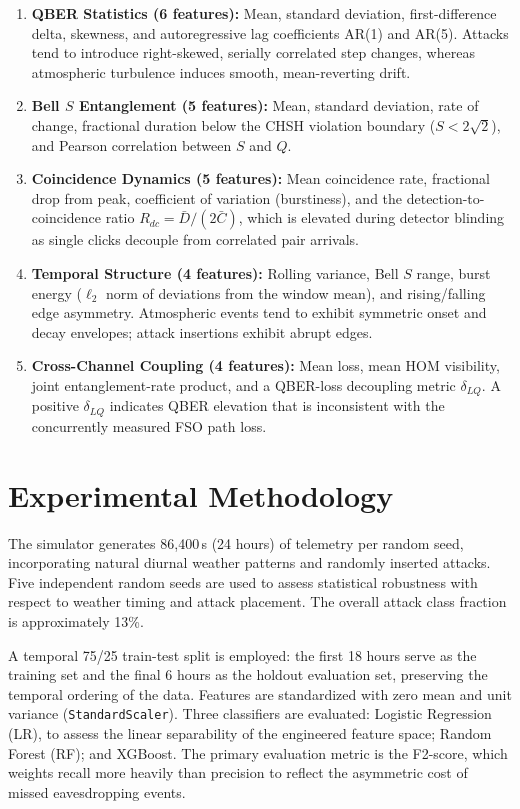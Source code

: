 \documentclass[conference]{IEEEtran}
\begin{document}
\begin{enumerate}
    \item \textbf{QBER Statistics (6 features):} Mean, standard deviation, first-difference delta, skewness, and autoregressive lag coefficients AR(1) and AR(5). Attacks tend to introduce right-skewed, serially correlated step changes, whereas atmospheric turbulence induces smooth, mean-reverting drift.
    \item \textbf{Bell $S$ Entanglement (5 features):} Mean, standard deviation, rate of change, fractional duration below the CHSH violation boundary ($S < 2\sqrt{2}$), and Pearson correlation between $S$ and $Q$.
    \item \textbf{Coincidence Dynamics (5 features):} Mean coincidence rate, fractional drop from peak, coefficient of variation (burstiness), and the detection-to-coincidence ratio $R_{dc} = \bar{D}/(2\bar{C})$, which is elevated during detector blinding as single clicks decouple from correlated pair arrivals.
    \item \textbf{Temporal Structure (4 features):} Rolling variance, Bell $S$ range, burst energy ($\ell_2$ norm of deviations from the window mean), and rising/falling edge asymmetry. Atmospheric events tend to exhibit symmetric onset and decay envelopes; attack insertions exhibit abrupt edges.
    \item \textbf{Cross-Channel Coupling (4 features):} Mean loss, mean HOM visibility, joint entanglement-rate product, and a QBER-loss decoupling metric $\delta_{LQ}$. A positive $\delta_{LQ}$ indicates QBER elevation that is inconsistent with the concurrently measured FSO path loss.
\end{enumerate}

\section{Experimental Methodology}

The simulator generates 86,400\,s (24 hours) of telemetry per random seed, incorporating natural diurnal weather patterns and randomly inserted attacks. Five independent random seeds are used to assess statistical robustness with respect to weather timing and attack placement. The overall attack class fraction is approximately 13\%.

A temporal 75/25 train-test split is employed: the first 18 hours serve as the training set and the final 6 hours as the holdout evaluation set, preserving the temporal ordering of the data. Features are standardized with zero mean and unit variance (\texttt{StandardScaler}). Three classifiers are evaluated: Logistic Regression (LR), to assess the linear separability of the engineered feature space; Random Forest (RF); and XGBoost. The primary evaluation metric is the F2-score, which weights recall more heavily than precision to reflect the asymmetric cost of missed eavesdropping events.
\end{document}
